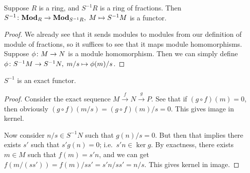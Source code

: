 \begin{proposition}
    Suppose \(R\) is a ring, and \(S^{-1}R\) is a ring of fractions.
    Then \(S^{-1}\colon\textbf{Mod}_R\to\textbf{Mod}_{S^{-1}R},\;M\mapsto S^{-1}M\)
    is a functor.
\end{proposition}
\begin{proof}
    We already see that it sends modules to modules from our definition of module of fractions,
    so it suffices to see that it maps module homomorphisms.
    Suppose \(\phi\colon M\to N\) is a module homomorphism.
    Then we can simply define \(\phi\colon S^{-1}M\to S^{-1}N,\;m/s\mapsto\phi(m)/s\).
\end{proof}
\begin{theorem}\label{thm:fraction-exact}
    \(S^{-1}\) is an exact functor.
\end{theorem}
\begin{proof}
    Consider the exact sequence \(M \overset{f}{\to} N \overset{g}{\to} P\).
    See that if \((g \circ f)(m) = 0\),
    then obviously \((g \circ f)(m/s) = (g \circ f)(m)/s = 0\).
    This gives image in kernel.

    Now consider \(n/s \in S^{-1}N\) such that \(g(n)/s = 0\).
    But then that implies there exists \(s'\) such that \(s'g(n) = 0\);
    i.e.\ \(s'n \in \ker g\).
    By exactness, there exists \(m \in M\) such that \(f(m) = s'n\),
    and we can get \(f(m/(ss')) = f(m)/ss' = s'n/ss' = n/s\).
    This gives kernel in image.
\end{proof}

